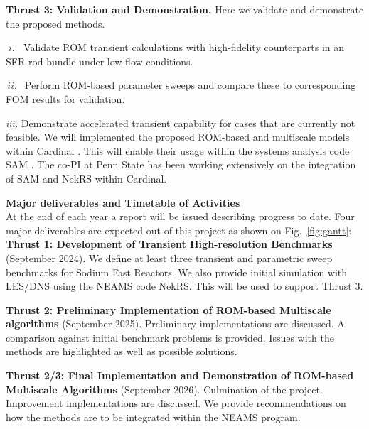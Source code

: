 \textbf{Thrust 3: Validation and Demonstration.} 
Here we validate and demonstrate the proposed methods.
\\[-5ex]
\begin{description}
\item{$\; i.\; \;$}
Validate ROM transient calculations with high-fidelity counterparts
in an SFR rod-bundle under low-flow conditions.
\\[-4ex]
\item{$\, ii. \,\;$}
Perform ROM-based parameter sweeps and compare these to corresponding
FOM results for validation.
\\[-4ex]
\item{\em iii.}
Demonstrate accelerated transient capability for cases that are currently not
feasible. We will implemented the proposed ROM-based and multiscale models within Cardinal \cite{cardinal}. This will enable their usage within the systems analysis code SAM \cite{hu2021}. The co-PI at Penn State has been working extensively on the integration of SAM and NekRS within Cardinal.
\\[-3ex]
\end{description}

\textbf{Major deliverables and Timetable of Activities} \\
At the end of each year a report will be issued describing progress to date.
Four major deliverables are expected out of this project as shown on
Fig.~\ref{fig:gantt}: \\

\vspace*{-.10in}
\noindent \textbf{Thrust 1: Development of Transient High-resolution
Benchmarks} (September 2024). We define at least three transient and parametric
sweep benchmarks for Sodium Fast Reactors. We also provide initial simulation
with LES/DNS using the NEAMS code NekRS. This will be used to support Thrust 3.

\noindent \textbf{Thrust 2: Preliminary Implementation of ROM-based Multiscale
algorithms} (September 2025). Preliminary implementations are discussed. A
comparison against initial benchmark problems is provided. Issues with the
methods are highlighted as well as possible solutions.

\noindent \textbf{Thrust 2/3: Final Implementation and Demonstration of
ROM-based Multiscale Algorithms} (September 2026). 
Culmination of the project. Improvement implementations are discussed. We
provide recommendations on how the methods are to be integrated within the
NEAMS program.

